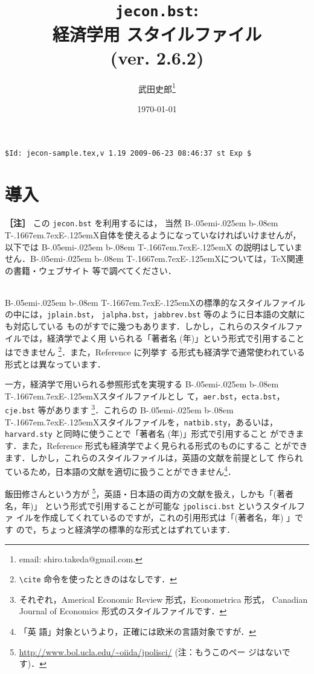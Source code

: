 \documentclass[a4j,10pt]{jarticle}
\title{\texttt{jecon.bst}:\\ 経済学用 \BibTeX{} スタイルファイル\\ (ver. 2.6.2)}
\author{武田史郎\thanks{email: {\ttfamily shiro.takeda@gmail.com}.}}
\date{\today}
\def\BibTeX{{\rm B\kern-.05em{\sc i\kern-.025em b}\kern-.08em
    T\kern-.1667em\lower.7ex\hbox{E}\kern-.125emX}}
\begin{document}
\maketitle

\begin{center}
 \verb|$Id: jecon-sample.tex,v 1.19 2009-06-23 08:46:37 st Exp $|
\end{center}

\tableofcontents


\section{導入}

\begin{screen}
\textbf{［注］} この \texttt{jecon.bst} を利用するには， 当然 
\BibTeX 自体を使えるようになっていなければいけませんが，以下では \BibTeX 
の説明はしていません．\BibTeX については，\TeX 関連の書籍・ウェブサイト
等で調べてください．
\end{screen}
\\

\BibTeX の標準的なスタイルファイルの中には，\texttt{jplain.bst}，
\texttt{jalpha.bst}，\texttt{jabbrev.bst} 等のように日本語の文献にも対応している
ものがすでに幾つもあります．しかし，これらのスタイルファイルでは，経済学でよく用
いられる「著者名 (年)」という形式で引用することはできません
\footnote{\verb|\cite| 命令を使ったときのはなしです．}．また，Reference に列挙す
る形式も経済学で通常使われている形式とは異なっています．

一方，経済学で用いられる参照形式を実現する \BibTeX スタイルファイルとし
て，\texttt{aer.bst}，\texttt{ecta.bst}，\texttt{cje.bst} 等があります
\footnote{それぞれ，Americal Economic Review 形式，Econometrica 形式，
Canadian Journal of Economics 形式のスタイルファイルです．}．これらの 
\BibTeX スタイルファイルを，\texttt{natbib.sty}，あるいは，
\texttt{harvard.sty} と同時に使うことで「著者名 (年)」形式で引用すること
ができます．また，Reference 形式も経済学でよく見られる形式のものにするこ
とができます．しかし，これらのスタイルファイルは，英語の文献を前提として
作られているため，日本語の文献を適切に扱うことができません\footnote{「英
語」対象というより，正確には欧米の言語対象ですが．}．

飯田修さんという方が
\footnote{\url{http://www.bol.ucla.edu/~oiida/jpolisci/} (注：もうこのペー
ジはないです)．}，英語・日本語の両方の文献を扱え，しかも「(著者名，年)」
という形式で引用することが可能な \texttt{jpolisci.bst} というスタイルファ
イルを作成してくれているのですが，これの引用形式は「(著者名，年) 」です
ので，ちょっと経済学の標準的な形式とはずれています．
\end{document}
